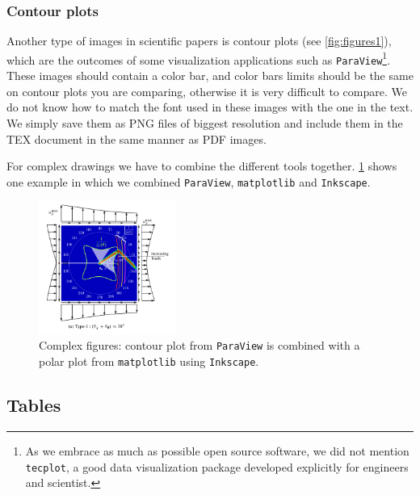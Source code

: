 \documentclass[authoryear,12pta4paper,fleqn]{article}
\numberwithin{equation}{section}
\theoremstyle{remark}
\begin{document}

\subsubsection{Contour plots}\label{sec:contours}

Another type of images in scientific papers is contour plots (see \cref{fig:figures1}), which are the outcomes of some visualization applications such as \texttt{ParaView}\footnote{As we embrace as much as possible open source software, we did not mention \texttt{tecplot},  a good data visualization package developed explicitly for engineers and scientist.}. These images should contain a color bar, and color bars limits should be the same on contour plots you are comparing, otherwise it is very difficult to compare. We do not know how to match the font used in these images with the one in the text. We simply save them as PNG files of biggest resolution and include them in the TEX document in the same manner as PDF images.

For complex drawings we have to combine the different tools together. \cref{fig:complex-fig} shows one example in which we combined \texttt{ParaView}, \texttt{matplotlib} and \texttt{Inkscape}. 



\begin{figure}[h!]
\centering
\includegraphics[width=0.4\textwidth]{complex-fig}
\caption{Complex figures: contour plot from \texttt{ParaView} is combined with a polar plot from \texttt{matplotlib} using \texttt{Inkscape}.}
\label{fig:complex-fig}
\end{figure}


 

\subsection{Tables}\label{sec:tabs}
\end{document}
